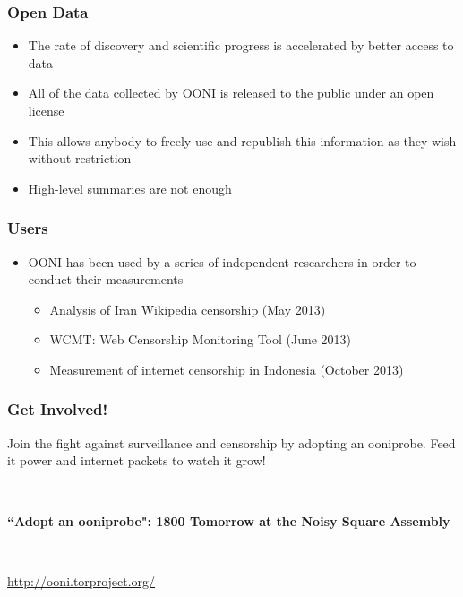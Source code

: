 \documentclass{beamer}
\begin{document}
\begin{frame}
	\frametitle{Open Data}
	\begin{itemize}
		\item{The rate of discovery and scientific progress is accelerated by better access to data}
		\item{All of the data collected by OONI is released to the public under an open license}
		\item{This allows anybody to freely use and republish this information as they wish without restriction}
		\item{High-level summaries are not enough}
	\end{itemize}
\end{frame}

\begin{frame}
	\frametitle{Users}
	\begin{itemize}
		\item{OONI has been used by a series of independent researchers in order to conduct their measurements}
			\begin{itemize}
				\item{Analysis of Iran Wikipedia censorship (May 2013)}
				\item{WCMT: Web Censorship Monitoring Tool (June 2013)}
				\item{ Measurement of internet censorship in Indonesia (October 2013)}
			\end{itemize}
	\end{itemize}
\end{frame}

\begin{frame}
	\frametitle{Get Involved!}
	Join the fight against surveillance and censorship by adopting
	an ooniprobe. Feed it power and internet packets to watch it grow!

	\ 

	{\Large\bf ``Adopt an ooniprobe": 1800 Tomorrow at the Noisy Square Assembly}

	\ 

	\url{http://ooni.torproject.org/}
\end{frame}	
\end{document}

